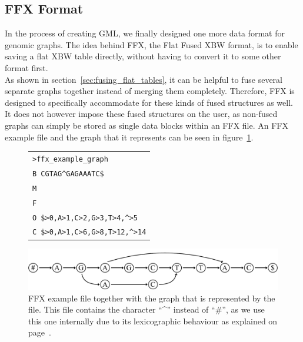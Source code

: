 \documentclass[a4paper,12pt,twoside,BCOR=10mm]{scrbook}
\begin{document}
\subsection{FFX Format}

In the process of creating GML, we finally designed one more data format for 
genomic graphs. The idea behind FFX, the Flat Fused XBW format, is to enable saving 
a flat XBW table directly, without having to convert it to some other format 
first. \\
As shown in section~\ref{sec:fusing_flat_tables}, 
it can be helpful to fuse several separate graphs together 
instead of merging them completely. Therefore, FFX is designed 
to specifically accommodate for these kinds of fused structures as well. 
It does not however impose these fused structures on the user, 
as non-fused graphs can simply be stored as single data blocks within 
an FFX file. 
An FFX example file and the graph that it represents can be seen in figure~\ref{fig:evo_fig_ffx_example}.

\begin{figure}[!htb]
\centering
\begin{tabularx}{1.0\textwidth}{ | X | }
\hline
\texttt{>ffx\_example\_graph} \\
\texttt{B \quad CGTAG{\textasciicircum}GAGAAATC\$} \\
\texttt{M \quad 111111111001111} \\
\texttt{F \quad 111011111011111} \\
\texttt{O \quad \$>0,A>1,C>2,G>3,T>4,{\textasciicircum}>5} \\
\texttt{C \quad \$>0,A>1,C>6,G>8,T>12,{\textasciicircum}>14} \\
\hline
\end{tabularx}
\includegraphics[width=\textwidth]{evo_fig_ffx_example.pdf}
\caption[FFX example file]{FFX example file together with the graph that is represented by the file. This file contains the character “{\textasciicircum}” instead of “$\#$”, as we use this one internally due to its lexicographic behaviour as explained on page~\pageref{hat_instead_of_hashtag}.} \label{fig:evo_fig_ffx_example}
\end{figure}
\end{document}
